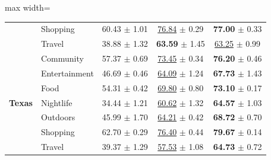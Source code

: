 \begin{table}[htbp]
\begin{adjustbox}{max width=\textwidth}
\begin{tabular}{clccc}
 & Shopping & 60.43 $\pm$ 1.01 & \underline{76.84} $\pm$ 0.29 & \textbf{77.00} $\pm$ 0.33 \\
 & Travel & 38.88 $\pm$ 1.32 & \textbf{63.59} $\pm$ 1.45 & \underline{63.25} $\pm$ 0.99 \\
\midrule
\multirow{7}{*}{\textbf{Texas}} & Community & 57.37 $\pm$ 0.69 & \underline{73.45} $\pm$ 0.34 & \textbf{76.20} $\pm$ 0.46 \\
 & Entertainment & 46.69 $\pm$ 0.46 & \underline{64.09} $\pm$ 1.24 & \textbf{67.73} $\pm$ 1.43 \\
 & Food & 54.31 $\pm$ 0.42 & \underline{69.80} $\pm$ 0.80 & \textbf{73.10} $\pm$ 0.17 \\
 & Nightlife & 34.44 $\pm$ 1.21 & \underline{60.62} $\pm$ 1.32 & \textbf{64.57} $\pm$ 1.03 \\
 & Outdoors & 45.99 $\pm$ 1.70 & \underline{64.21} $\pm$ 0.42 & \textbf{68.72} $\pm$ 0.70 \\
 & Shopping & 62.70 $\pm$ 0.29 & \underline{76.40} $\pm$ 0.44 & \textbf{79.67} $\pm$ 0.14 \\
 & Travel & 39.37 $\pm$ 1.29 & \underline{57.53} $\pm$ 1.08 & \textbf{64.73} $\pm$ 0.72 \\
\bottomrule
\end{tabular}
\end{adjustbox}
\end{table}
